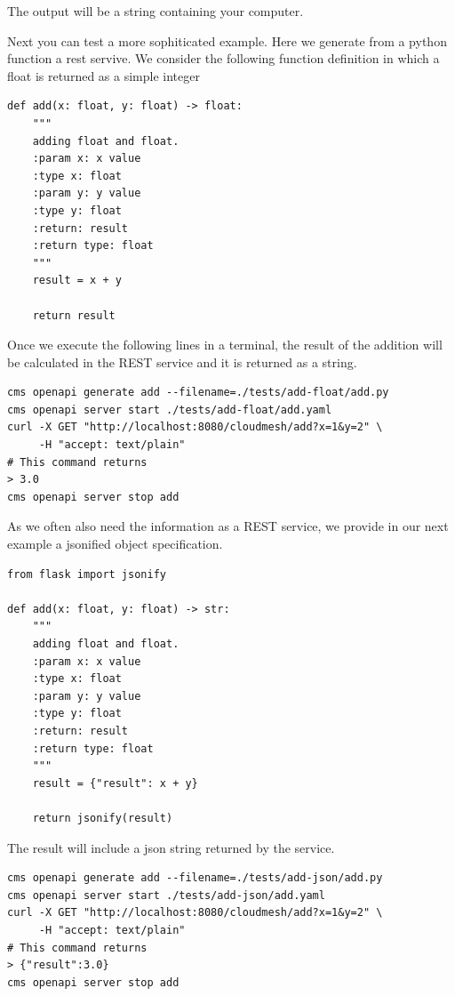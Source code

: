 The output will be a string containing your computer.


Next you can test a more sophiticated example. Here we generate from a
python function a rest servive. We consider the following function
definition in which a float is returned as a simple integer

\begin{verbatim}
def add(x: float, y: float) -> float:
    """
    adding float and float.
    :param x: x value
    :type x: float
    :param y: y value
    :type y: float
    :return: result
    :return type: float
    """
    result = x + y

    return result
\end{verbatim}

Once we execute the following lines in a terminal, the result of the
addition will be calculated in the REST service and it is returned as a
string.

\begin{verbatim}
cms openapi generate add --filename=./tests/add-float/add.py
cms openapi server start ./tests/add-float/add.yaml 
curl -X GET "http://localhost:8080/cloudmesh/add?x=1&y=2" \
     -H "accept: text/plain"
# This command returns
> 3.0
cms openapi server stop add
\end{verbatim}

As we often also need the information as a REST service, we provide in
our next example a jsonified object specification.

\begin{verbatim}
from flask import jsonify

def add(x: float, y: float) -> str:
    """
    adding float and float.
    :param x: x value
    :type x: float
    :param y: y value
    :type y: float
    :return: result
    :return type: float
    """
    result = {"result": x + y}

    return jsonify(result)
\end{verbatim}

The result will include a json string returned by the service.

\begin{verbatim}
cms openapi generate add --filename=./tests/add-json/add.py
cms openapi server start ./tests/add-json/add.yaml 
curl -X GET "http://localhost:8080/cloudmesh/add?x=1&y=2" \
     -H "accept: text/plain"
# This command returns
> {"result":3.0}
cms openapi server stop add
\end{verbatim}

